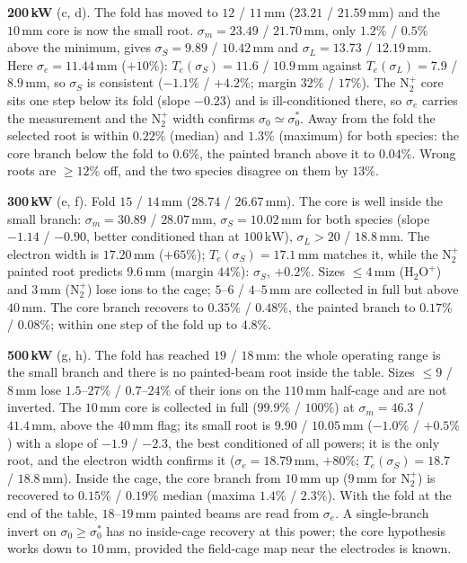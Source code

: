 \documentclass[hyperref]{cernrep}
\begin{document}
\noindent\textbf{200\,kW} (c, d). The fold has moved to $12$ /
$11\,\mathrm{mm}$ ($23.21$ / $21.59\,\mathrm{mm}$) and the
$10\,\mathrm{mm}$ core is now the small root. $\sigma_m=23.49$ /
$21.70\,\mathrm{mm}$, only $1.2\%$ / $0.5\%$ above the minimum, gives
$\sigma_S=9.89$ / $10.42\,\mathrm{mm}$ and $\sigma_L=13.73$ /
$12.19\,\mathrm{mm}$. Here $\sigma_e=11.44\,\mathrm{mm}$ ($+10\%$):
$T_e(\sigma_S)=11.6$ / $10.9\,\mathrm{mm}$ against
$T_e(\sigma_L)=7.9$ / $8.9\,\mathrm{mm}$, so $\sigma_S$ is consistent
($-1.1\%$ / $+4.2\%$; margin $32\%$ / $17\%$). The $\mathrm{N}_2^+$ core sits one step below
its fold (slope $-0.23$) and is ill-conditioned there, so $\sigma_e$
carries the measurement and the $\mathrm{N}_2^+$ width confirms
$\sigma_0\simeq\sigma_0^*$. Away from the fold the selected root is
within $0.22\%$ (median) and $1.3\%$ (maximum) for both species: the
core branch below the fold to $0.6\%$, the painted branch above it
to $0.04\%$. Wrong roots are $\ge 12\%$ off,
and the two species disagree on them by $13\%$.

\noindent\textbf{300\,kW} (e, f). Fold $15$ / $14\,\mathrm{mm}$
($28.74$ / $26.67\,\mathrm{mm}$). The core is well inside the small
branch: $\sigma_m=30.89$ / $28.07\,\mathrm{mm}$, $\sigma_S=10.02\,
\mathrm{mm}$ for both species (slope $-1.14$ / $-0.90$, better
conditioned than at $100\,\mathrm{kW}$), $\sigma_L>20$ /
$18.8\,\mathrm{mm}$. The electron width is $17.20\,\mathrm{mm}$
($+65\%$); $T_e(\sigma_S)=17.1\,\mathrm{mm}$ matches it, while the
$\mathrm{N}_2^+$ painted root predicts $9.6\,\mathrm{mm}$ (margin
$44\%$): $\sigma_S$, $+0.2\%$. Sizes
$\le 4\,\mathrm{mm}$ ($\mathrm{H}_2\mathrm{O}^+$) and $3\,\mathrm{mm}$
($\mathrm{N}_2^+$) lose ions to the cage; $5$--$6$ /
$4$--$5\,\mathrm{mm}$ are collected in full but above
$40\,\mathrm{mm}$. The core branch recovers to $0.35\%$ / $0.48\%$, the painted branch
to $0.17\%$ / $0.08\%$; within one step of the fold up to $4.8\%$.

\noindent\textbf{500\,kW} (g, h). The fold has reached $19$ /
$18\,\mathrm{mm}$: the whole operating range is the small branch and
there is no painted-beam root inside the table. Sizes $\le 9$ /
$8\,\mathrm{mm}$ lose $1.5$--$27\%$ / $0.7$--$24\%$ of their ions on
the $110\,\mathrm{mm}$ half-cage and are not inverted. The
$10\,\mathrm{mm}$ core is collected in full ($99.9\%$ / $100\%$) at
$\sigma_m=46.3$ / $41.4\,\mathrm{mm}$, above the $40\,\mathrm{mm}$
flag; its small root is $9.90$ / $10.05\,\mathrm{mm}$ ($-1.0\%$ /
$+0.5\%$) with a slope of $-1.9$ / $-2.3$, the best conditioned of all
powers; it is the only root, and the electron width confirms it
($\sigma_e=18.79\,\mathrm{mm}$, $+80\%$; $T_e(\sigma_S)=18.7$ /
$18.8\,\mathrm{mm}$). Inside the cage, the core branch from $10\,\mathrm{mm}$ up
($9\,\mathrm{mm}$ for $\mathrm{N}_2^+$) is recovered to $0.15\%$ /
$0.19\%$ median (maxima $1.4\%$ / $2.3\%$). With the fold
at the end of the table, $18$--$19\,\mathrm{mm}$ painted beams are read from
$\sigma_e$. A single-branch invert on $\sigma_0\ge\sigma_0^*$ has no
inside-cage recovery at this power; the core hypothesis works down to
$10\,\mathrm{mm}$, provided the field-cage map near the electrodes is
known.
\end{document}
